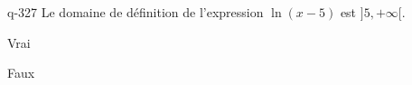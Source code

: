 \begin{truefalse}{q-327}
Le domaine de définition de l'expression $\ln(x-5)$ est $]5,+\infty[$.
\item* Vrai
\item Faux
\end{truefalse}


